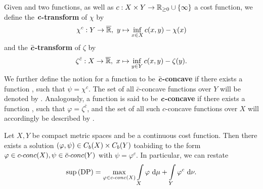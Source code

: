 \begin{definition}\label{cTrafo}
	Given  and  two functions, as well as $\map[c]{X \times Y}{\RZero{} \cup{} \{ \infty \}}$ a cost function, we define the \textbf{$\text{\textbf{\textit{c}}}$-transform} of $\chi$ by
	\[ \map[\chi^c]{Y}{\Rbar},~y \mapsto \inf\limits_{x \in X} c(x, y) - \chi(x) \]
	and the \textbf{$\bar{\text{\textbf{\textit{c}}}}$-transform} of $\zeta$ by
	\[ \map[\zeta^{\bar{c}}]{X}{\Rbar},~x \mapsto \inf\limits_{y \in Y} c(x, y) - \zeta(y). \]
	We further define the notion for a function  to be \textbf{$\bar{\text{\textbf{\textit{c}}}}$-concave} if there exists a function , such that $\psi = \chi^c$. The set of all $\bar{c}$-concave functions over $Y$ will be denoted by . Analogously, a function  is said to be \textbf{$\text{\textbf{\textit{c}}}$-concave} if there exists a function , such that $\varphi = \zeta^{\bar{c}}$, and the set of all such $c$-concave functions over $X$ will accordingly be described by .
\end{definition}

\begin{theorem}\label{DPSolExist}
	Let $X, Y$ be compact metric spaces and  be a continuous cost function. Then there exists a solution $(\varphi,\psi) \in \CF[b]{X} \times \CF[b]{Y}$ toabiding to the form $\varphi \in \CConc{X}, \psi \in \CBConc{Y}$ with $\psi = \varphi^c$. In particular, we can restate
	\[ \sup\!\text{\normalfont\,(DP)} = \max\limits_{\varphi \in \CConc{X}} \int\limits_X \varphi~\D + \int\limits_Y \varphi^c~\D[\nu]. \]
\end{theorem}


